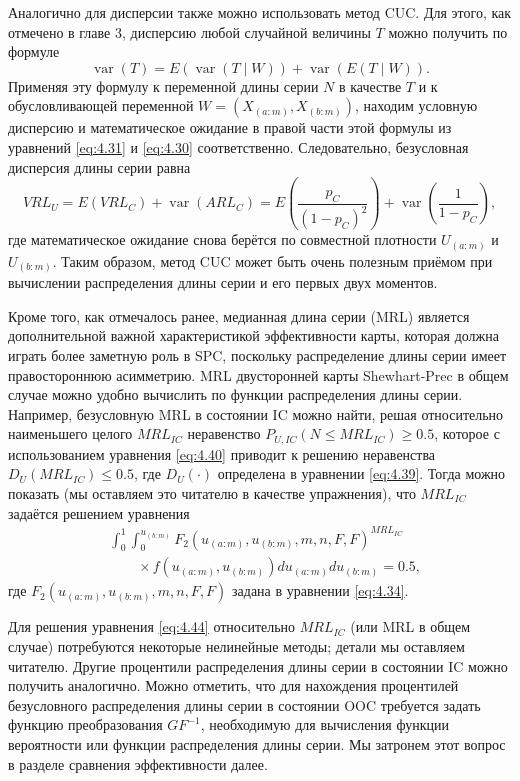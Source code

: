 Аналогично для дисперсии также можно использовать метод CUC. Для этого, как отмечено в главе 3, дисперсию любой случайной величины \(T\) можно получить по формуле
\[
	\operatorname{var}(T) = E\left( \operatorname{var}(T \mid W) \right) + \operatorname{var}\left( E(T \mid W) \right).
\]
Применяя эту формулу к переменной длины серии \(N\) в качестве \(T\) и к обусловливающей переменной \(W = \left( X_{(a:m)}, X_{(b:m)} \right)\), находим условную дисперсию и математическое ожидание в правой части этой формулы из уравнений \eqref{eq:4.31} и \eqref{eq:4.30} соответственно. Следовательно, безусловная дисперсия длины серии равна
\[
	VRL_U = E\left( VRL_C \right) + \operatorname{var}\left( ARL_C \right) = E\left( \frac{p_C}{(1 - p_C)^2} \right) + \operatorname{var}\left( \frac{1}{1 - p_C} \right),
\]
где математическое ожидание снова берётся по совместной плотности \(U_{(a:m)}\) и \(U_{(b:m)}\). Таким образом, метод CUC может быть очень полезным приёмом при вычислении распределения длины серии и его первых двух моментов.

Кроме того, как отмечалось ранее, медианная длина серии (MRL) является дополнительной важной характеристикой эффективности карты, которая должна играть более заметную роль в SPC, поскольку распределение длины серии имеет правостороннюю асимметрию. MRL двусторонней карты Shewhart-Prec в общем случае можно удобно вычислить по функции распределения длины серии. Например, безусловную MRL в состоянии IC можно найти, решая относительно наименьшего целого \(MRL_{IC}\) неравенство \(P_{U, IC}\left( N \le MRL_{IC} \right) \ge 0.5\), которое с использованием уравнения \eqref{eq:4.40} приводит к решению неравенства \(D_U\left( MRL_{IC} \right) \le 0.5\), где \(D_U(\cdot)\) определена в уравнении \eqref{eq:4.39}. Тогда можно показать (мы оставляем это читателю в качестве упражнения), что \(MRL_{IC}\) задаётся решением уравнения
\begin{equation}
\begin{aligned}
	&\int_{0}^{1}\int_{0}^{u_{(b:m)}} F_2\left( u_{(a:m)}, u_{(b:m)}, m, n, F, F \right)^{MRL_{IC}} \\
	&\qquad \times f\left(u_{(a:m)}, u_{(b:m)}\right) du_{(a:m)} du_{(b:m)} = 0.5,
\end{aligned}
\label{eq:4.44}
\end{equation}
где \(F_2\left( u_{(a:m)}, u_{(b:m)}, m, n, F, F \right)\) задана в уравнении \eqref{eq:4.34}.

Для решения уравнения \eqref{eq:4.44} относительно \(MRL_{IC}\) (или MRL в общем случае) потребуются некоторые нелинейные методы; детали мы оставляем читателю. Другие процентили распределения длины серии в состоянии IC можно получить аналогично. Можно отметить, что для нахождения процентилей безусловного распределения длины серии в состоянии OOC требуется задать функцию преобразования \(GF^{-1}\), необходимую для вычисления функции вероятности или функции распределения длины серии. Мы затронем этот вопрос в разделе сравнения эффективности далее.

